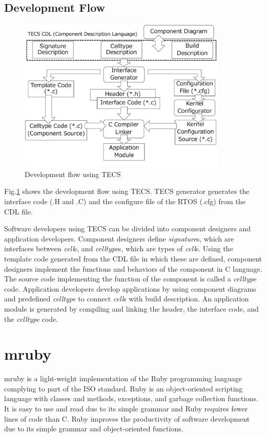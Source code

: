 \documentclass[a4j,12pt,oneside,openany,english]{jsbook}
\begin{document}
\subsection{Development Flow}

\begin{figure}[t]
    \centering
    \includegraphics[width=10cm,clip]{figure/TECSFlow.pdf}
    \caption{Development flow using TECS}
    \label{fig:TECSFlow}
\end{figure}

Fig.\ref{fig:TECSFlow} shows the development flow using TECS.
TECS generator generates the interface code (.H and .C) and the configure file of the RTOS (.cfg) from the CDL file.

Software developers using TECS can be divided into component designers and application developers.
Component designers define {\it signature}s, which are interfaces between {\it cell}s, and {\it celltype}s, which are types of {\it cell}s.
Using the template code generated from the CDL file in which these are defined, component designers implement the functions and behaviors of the component in C language.
The source code implementing the function of the component is called a {\it celltype} code.
Application developers develop applications by using component diagrams and predefined {\it celltype} to connect {\it cell}s with build description.
An application module is generated by compiling and linking the header, the interface code, and the {\it celltype} code.


\section{mruby}
\label{sec:mruby}

mruby is a light-weight implementation of the Ruby programming language complying to part of the ISO standard.
Ruby is an object-oriented scripting language \cite{url:Ruby} with classes and methods, exceptions, and garbage collection functions.
It is easy to use and read due to its simple grammar and Ruby requires fewer lines of code than C.
Ruby improves the productivity of software development due to its simple grammar and object-oriented functions.
\end{document}
